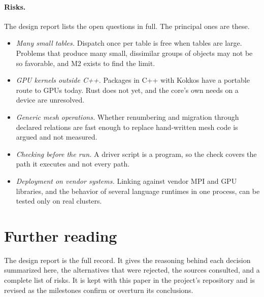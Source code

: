 \documentclass[11pt,a4paper]{article}
\begin{document}
\paragraph{Risks.}  The design report lists the open questions in full.
The principal ones are these.

\begin{itemize}[itemsep=1pt]
  \item \emph{Many small tables.}  Dispatch once per table is free when
        tables are large.  Problems that produce many small, dissimilar
        groups of objects may not be so favorable, and M2 exists to find
        the limit.
  \item \emph{GPU kernels outside C++.}  Packages in C++ with Kokkos have a
        portable route to GPUs today.  Rust does not yet, and the core's
        own needs on a device are unresolved.
  \item \emph{Generic mesh operations.}  Whether renumbering and migration
        through declared relations are fast enough to replace hand-written
        mesh code is argued and not measured.
  \item \emph{Checking before the run.}  A driver script is a program, so
        the check covers the path it executes and not every path.
  \item \emph{Deployment on vendor systems.}  Linking against vendor MPI and
        GPU libraries, and the behavior of several language runtimes in one
        process, can be tested only on real clusters.
\end{itemize}

\section{Further reading}

The design report is the full record.  It gives the reasoning behind each
decision summarized here, the alternatives that were rejected, the sources
consulted, and a complete list of risks.  It is kept with this paper in the
project's repository and is revised as the milestones confirm or overturn
its conclusions.

\printbibliography
\end{document}
